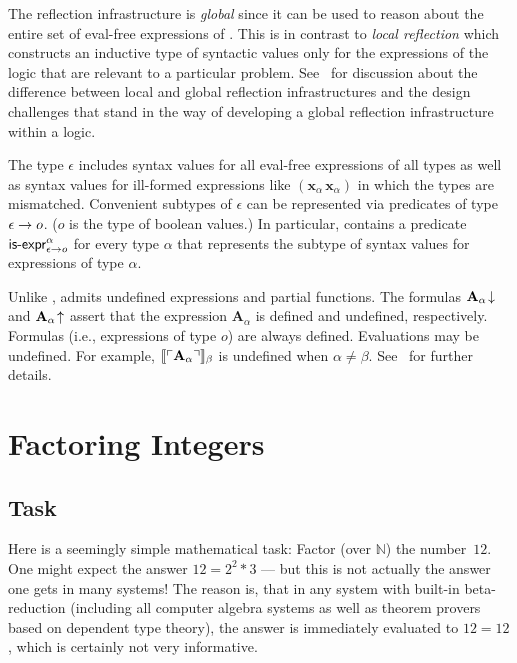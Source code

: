 \documentclass[fleqn]{llncs}
\newcommand{\NN}{\ensuremath{\mathbb{N}}}
\begin{document}
The reflection infrastructure is \emph{global} since it can be used to
reason about the entire set of eval-free expressions of {\churchuqe}.
This is in contrast to \emph{local reflection} which constructs an
inductive type of syntactic values only for the expressions of the logic that
are relevant to a particular problem.  See~\cite{Farmer18} for discussion about
the difference between local and global reflection infrastructures and the
design challenges that stand in the way of developing a global reflection
infrastructure within a logic.

The type $\epsilon$ includes syntax values for all eval-free
expressions of all types as well as syntax values for ill-formed
expressions like $(\textbf{x}_\alpha \, \textbf{x}_\alpha)$ in which
the types are mismatched.  Convenient subtypes of $\epsilon$ can be
represented via predicates of type $\epsilon \rightarrow o$.  ($o$ is the
type of boolean values.)  In particular, {\churchuqe} contains a
predicate $\mbox{\sf is-expr}^{\alpha}_{\epsilon \rightarrow o}$ for every type
$\alpha$ that represents the subtype of syntax values for expressions
of type $\alpha$.

Unlike {\churchqe}, {\churchuqe} admits undefined expressions and
partial functions.  The formulas $\textbf{A}_\alpha\!\downarrow$ and
$\textbf{A}_\alpha\!\uparrow$ assert that the expression
$\textbf{A}_\alpha$ is defined and undefined, respectively.  Formulas
(i.e., expressions of type $o$) are always defined.  Evaluations may
be undefined.  For example,
$\llbracket\ulcorner\textbf{A}_\alpha\urcorner\rrbracket_\beta$ is undefined when
$\alpha \not= \beta$.  See~\cite{Farmer08a,Farmer17} for further
details.

\section{Factoring Integers}\label{sec:factoring}

\subsection{Task}

Here is a seemingly simple mathematical task: Factor (over $\NN$)
the number~$12$.  One might expect the answer $12 = 2^2 * 3$ ---
but this is not actually the answer one gets in many systems!  The reason
is, that in any system with built-in beta-reduction (including all
computer algebra systems as well as theorem provers based on dependent
type theory), the answer is immediately evaluated to \mbox{$12 = 12$}, which is
certainly not very informative.
\end{document}
